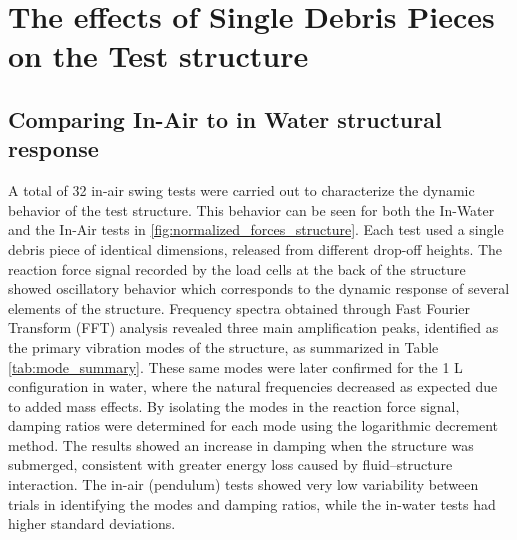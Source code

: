 \documentclass{article}
\begin{document}
{\begin{figure}[htbp]
\end{figure}

\section{The effects of Single Debris Pieces on the Test structure} 
\subsection{Comparing In-Air to in Water structural response} 
A total of 32 in-air swing tests were carried out to characterize the dynamic behavior of the test structure. This behavior can be seen for both the In-Water and the In-Air tests in \ref{fig:normalized_forces_structure}. Each test used a single debris piece of identical dimensions, released from different drop-off heights. The reaction force signal recorded by the load cells at the back of the structure showed oscillatory behavior which corresponds to the dynamic response of several elements of the structure. Frequency spectra obtained through Fast Fourier Transform (FFT) analysis revealed three main amplification peaks, identified as the primary vibration modes of the structure, as summarized in Table \ref{tab:mode_summary}. These same modes were later confirmed for the 1 L configuration in water, where the natural frequencies decreased as expected due to added mass effects. By isolating the modes in the reaction force signal, damping ratios were determined for each mode using the logarithmic decrement method. The results showed an increase in damping when the structure was submerged, consistent with greater energy loss caused by fluid–structure interaction. The in-air (pendulum) tests showed very low variability between trials in identifying the modes and damping ratios, while the in-water tests had higher standard deviations.


}
\end{document}
